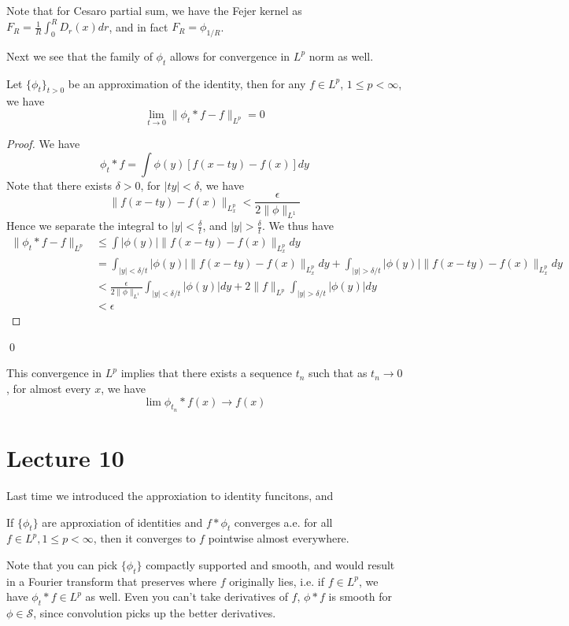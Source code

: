 \begin{remark}
    Note that for Cesaro partial sum, we have the Fejer kernel as $F_R=\frac{1}{R}\int_0^R D_r(x)dr$, and in fact $F_R=\phi_{1/R}$.
\end{remark}
Next we see that the family of $\phi_t$ allows for convergence in $L^p$ norm as well.
\begin{theorem}
    Let $\{\phi_t\}_{t>0}$ be an approximation of the identity, then for any $f\in L^p$, $1\leq p<\infty$, we have
    \begin{equation*}
        \lim_{t\to 0}\|\phi_t\ast f-f\|_{L^p}=0
    \end{equation*}
\end{theorem}
\begin{proof}
    We have
    \begin{equation*}
        \phi_t\ast f=\int\phi(y)[f(x-ty)-f(x)]dy
    \end{equation*}
    Note that there exists $\delta>0$, for $|ty|<\delta$, we have
    \begin{equation*}
        \|f(x-ty)-f(x)\|_{L_x^p}<\frac{\epsilon}{2\|\phi\|_{L^1}}
    \end{equation*}
    Hence we separate the integral to $|y|<\frac{\delta}{t}$, and $|y|>\frac{\delta}{t}$. We thus have
    \begin{align*}
        \|\phi_t\ast f-f\|_{L^p}&\leq \int|\phi(y)|\|f(x-ty)-f(x)\|_{L_x^p}dy\\
        &=\int_{|y|<\delta/t}|\phi(y)|\|f(x-ty)-f(x)\|_{L_x^p}dy+\int_{|y|>\delta/t}|\phi(y)|\|f(x-ty)-f(x)\|_{L_x^p}dy\\
        &<\frac{\epsilon}{2\|\phi\|_{L^1}}\int_{|y|<\delta/t}|\phi(y)|dy+2\|f\|_{L^p}\int_{|y|>\delta/t}|\phi(y)|dy\\
        &<\epsilon
    \end{align*}
\end{proof}
\qed

This convergence in $L^p$ implies that there exists a sequence $t_n$ such that as $t_n\to 0$, for almost every $x$, we have
\begin{equation*}
    \lim\phi_{t_n}\ast f(x)\to f(x)
\end{equation*}


\section{Lecture 10}
Last time we introduced the approxiation to identity funcitons, and 
\begin{exercise}
    If $\{\phi_t\}$ are approxiation of identities and $f\ast \phi_t$ converges a.e. for all $f\in L^p, 1\leq p<\infty$, then it converges to $f$ pointwise almost everywhere.
\end{exercise}
\begin{remark}
    Note that you can pick $\{\phi_t\}$ compactly supported and smooth, and would result in a Fourier transform that preserves where $f$ originally lies, i.e. if $f\in L^p$, we have $\phi_t\ast f\in L^p$ as well. Even you can't take derivatives of $f$, $\phi\ast f$ is smooth for $\phi\in\mathcal{S}$, since convolution picks up the better derivatives.
\end{remark}


